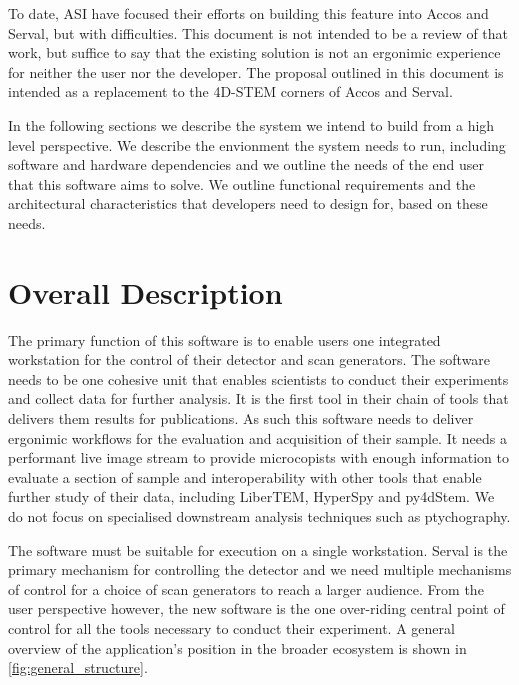 \documentclass[10pt]{article}
\begin{document}
To date, ASI have focused their efforts on building this feature into Accos and Serval, but with difficulties. This document is not intended to be a review of that work, but suffice to say that the existing solution is not an ergonimic experience for neither the user nor the developer. The proposal outlined in this document is intended as a replacement to the 4D-STEM corners of Accos and Serval.

In the following sections we describe the system we intend to build from a high level perspective. We describe the envionment the system needs to run, including software and hardware dependencies and we outline the needs of the end user that this software aims to solve. We outline functional requirements and the architectural characteristics that developers need to design for, based on these needs.

\section{Overall Description}\label{sec:overall_description}
The primary function of this software is to enable users one integrated workstation for the control of their detector and scan generators. The software needs to be one cohesive unit that enables scientists to conduct their experiments and collect data for further analysis. It is the first tool in their chain of tools that delivers them results for publications. As such this software needs to deliver ergonimic workflows for the evaluation and acquisition of their sample. It needs a performant live image stream to provide microcopists with enough information to evaluate a section of sample and interoperability with other tools that enable further study of their data, including LiberTEM, HyperSpy and py4dStem. We do not focus on specialised downstream analysis techniques such as ptychography.

The software must be suitable for execution on a single workstation. Serval is the primary mechanism for controlling the detector and we need multiple mechanisms of control for a choice of scan generators to reach a larger audience. From the user perspective however, the new software is the one over-riding central point of control for all the tools necessary to conduct their experiment. A general overview of the application's position in the broader ecosystem is shown in \cref{fig:general_structure}.
\end{document}
